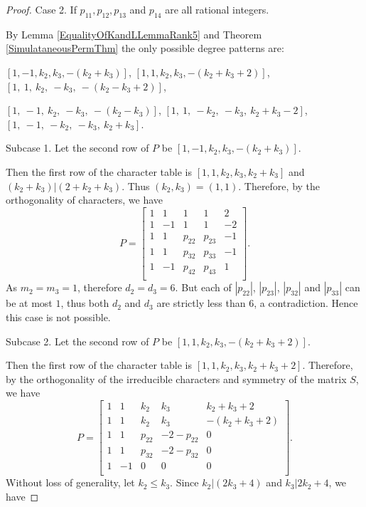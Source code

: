 \documentclass[12pt]{amsart}
\begin{document}
\begin{proof}
\medskip

Case 2. If $p_{11},  p_{12}, p_{13}$ and  $p_{14}$ are all rational integers.

\smallskip

By Lemma \ref{EqualityOfKandLLemmaRank5} and Theorem \ref{SimulataneousPermThm} the only possible degree patterns are:

$[1, -1, k_2, k_3, -(k_2+k_3)]$, $[1, 1, k_2, k_3, -(k_2+k_3+2)]$, $[1, ~ 1,~     k_2,   ~-k_3,~ -(k_2-k_3+2)]$,

$[1, ~ -1,~     k_2,   ~-k_3,~ -(k_2-k_3)]$, $[1, ~ 1,~     -k_2,   ~-k_3,~ k_2+k_3-2]$, $[1, ~ -1,~     -k_2,   ~-k_3,~ k_2+k_3]$.

\medskip

Subcase 1. Let the second row of $P$ be $[1, -1, k_2, k_3, -(k_2+k_3)]$.

\smallskip

Then the first row of the character table is $[1, 1, k_2, k_3, k_2+k_3]$ and $(k_2+k_3)\big|(2+k_2+k_3)$. Thus $(k_2,k_3)=(1,1)$.
Therefore, by the orthogonality of characters, we have
$$P=\left[
   \begin{array}{ccccc}
     1 & 1 & 1 &1&2\\
     1 & -1 &    1 &  1&-2\\
     1 &  1 &  p_{22}&  p_{23}& -1\\
     1 & 1 &  p_{32}&  p_{33}& -1\\
     1 &  -1 & p_{42}&  p_{43}& 1\\
   \end{array}\right].
$$
As $m_2=m_3=1$, therefore $d_2=d_3=6$. But each of $|p_{22}|$, $|p_{23}|$, $|p_{32}|$ and $|p_{33}|$ can be at most $1$, thus both $d_2$ and $d_3$ are strictly less than  $6$, a contradiction. Hence this case is not possible.

\medskip

Subcase 2. Let the second row of $P$ be $[1, 1, k_2, k_3, -(k_2+k_3+2)]$.

\smallskip

Then the first row of the character table is $[1, 1, k_2, k_3, k_2+k_3+2]$.
Therefore, by the orthogonality of the irreducible characters and symmetry of the matrix $S$, we have
$$P=\left[
   \begin{array}{ccccc}
     1 & 1 & k_2 &k_3&k_2+k_3+2\\
     1 & 1 &   k_2 &  k_3&-(k_2+k_3+2)\\
      1 &  1 &  p_{22}&  -2-p_{22}& 0\\
     1 & 1 &  p_{32}&  -2-p_{32}& 0\\
     1 &  -1 &  0&  0& 0\\
   \end{array}\right].
$$
Without loss of generality, let $k_2\leq k_3$. Since $k_2\big|(2k_3+4)$ and $k_3\big|2k_2+4$, we have


\end{proof}
\end{document}
